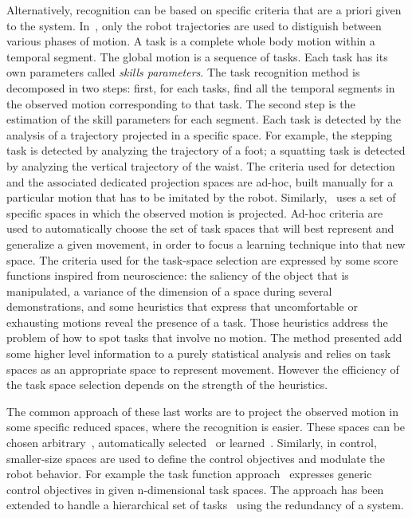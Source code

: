 \documentclass[letterpaper, 10pt, conference]{ieeeconf}      %
\begin{document}
Alternatively, recognition can be based on specific criteria that are a priori given 
to the system. In~\cite{nakaoka07}, only the robot trajectories
are used to distiguish between various phases of motion. A task is
a complete whole body motion within a temporal segment. The global motion
is a sequence of tasks. Each task has its own
parameters called \emph{skills parameters}. The task recognition method is decomposed in two steps: 
first, for each tasks, find all the temporal segments in the observed motion
corresponding to that task.
The second step is the estimation of the skill parameters for each segment.
Each task is detected by the analysis of a trajectory projected in a specific space.
For example, the stepping task is detected by analyzing the trajectory 
of a foot; a squatting task is detected by analyzing the vertical trajectory of the waist.
The criteria used for detection and the associated dedicated projection spaces
are ad-hoc, built manually for a particular motion that has to be imitated by the robot.
Similarly,~\cite{muhlig09} uses a set of specific spaces
in which the observed motion is projected. Ad-hoc criteria
are used to automatically choose the set of task spaces that will best 
represent and generalize a given movement, in order to focus
a learning technique into that new space. The criteria used for the task-space selection
are expressed by some score functions inspired from neuroscience:
the saliency of the object that is manipulated, a variance of the dimension
of a space during several demonstrations, and some heuristics that express that
uncomfortable or exhausting motions reveal the presence of a task. Those heuristics
address the problem of how to spot tasks that involve no motion. The method
presented add some higher level information to a purely statistical analysis and relies
on task spaces as an appropriate space to represent movement. However
the efficiency of the task space selection depends on the strength
of the heuristics.

The common approach of these last works are to project the observed motion in some specific reduced spaces,
where the recognition is easier. These spaces can be chosen arbitrary~\cite{nakaoka07}, 
automatically selected~\cite{muhlig09} or learned~\cite{peters08}. Similarly, in control,
smaller-size spaces are used to define the control objectives and modulate the robot behavior.
For example the task function approach~\cite{samson91} expresses generic control objectives in
given n-dimensional task spaces.
The approach has been extended to handle a hierarchical set of tasks~\cite{siciliano91, nakamura87}
using the redundancy of a system.
\medskip
\end{document}
